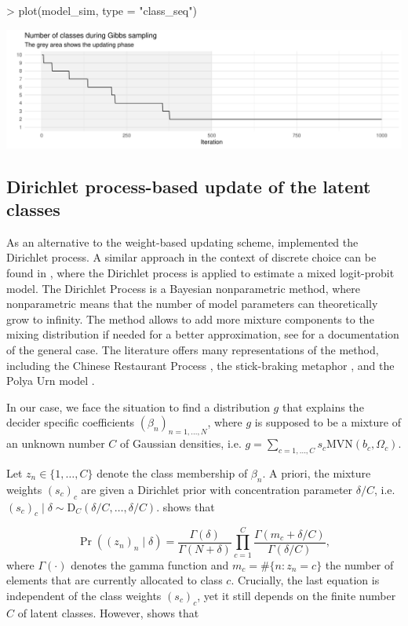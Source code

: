 \documentclass[article]{jss}
\begin{document}
\begin{Schunk}
\begin{Sinput}
> plot(model_sim, type = "class_seq")
\end{Sinput}
\end{Schunk}
\includegraphics{rprobitb_oelschlaeger_bauer-model-sim-class-seq}

\subsection{Dirichlet process-based update of the latent classes} \label{subsec:dp_update}

As an alternative to the weight-based updating scheme,  implemented the Dirichlet process. A similar approach in the context of discrete choice can be found in \cite{Burda:2008}, where the Dirichlet process is applied to estimate a mixed logit-probit model. The Dirichlet Process is a Bayesian nonparametric method, where nonparametric means that the number of model parameters can theoretically grow to infinity. The method allows to add more mixture components to the mixing distribution if needed for a better approximation, see \cite{Neal:2000} for a documentation of the general case. The literature offers many representations of the method, including the Chinese Restaurant Process \citep{Aldous:1985}, the stick-braking metaphor \citep{Sethuraman:1994}, and the Polya Urn model \citep{Blackwell:1973}.

In our case, we face the situation to find a distribution $g$ that explains the decider specific coefficients $(\beta_n)_{n = 1,\dots,N}$, where $g$ is supposed to be a mixture of an unknown number $C$ of Gaussian densities, i.e. $g = \sum_{c = 1,\dots,C} s_c \text{MVN}(b_c, \Omega_c)$.

Let $z_n \in \{1,\dots,C\}$ denote the class membership of $\beta_n$. A priori, the mixture weights $(s_c)_c$ are given a Dirichlet prior with concentration parameter $\delta/C$, i.e. $(s_c)_c \mid \delta \sim \text{D}_C(\delta/C,\dots,\delta/C)$. \cite{Rasmussen:2000} shows that

$$ \Pr((z_n)_n\mid \delta) = \frac{\Gamma(\delta)}{\Gamma(N+\delta)} \prod_{c=1}^C \frac{\Gamma(m_c + \delta/C)}{\Gamma(\delta/C)}, $$
where $\Gamma(\cdot)$ denotes the gamma function and $m_c = \#\{n:z_n = c\}$ the number of elements that are currently allocated to class $c$. Crucially, the last equation is independent of the class weights $(s_c)_c$, yet it still depends on the finite number $C$ of latent classes. However, \cite{Li:2019} shows that
\end{document}
